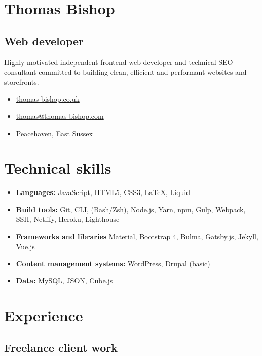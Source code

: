 \documentclass[11pt,a4paper]{article}
\begin{document}
 
\section*{\LARGE{Thomas Bishop}}
\subsection*{\Large{Web developer}}

Highly motivated independent frontend web developer and technical SEO consultant committed to building clean, efficient and performant websites and storefronts.

\begin{itemize}
    \item \href{https://www.thomas-bishop.co.uk}{thomas-bishop.co.uk}
    \item \href{mailto:thomas@thomas-bishop.com}{thomas@thomas-bishop.com}
    \item  \href{https://www.google.com/maps/place/Peacehaven/@50.7980857,-0.0088727,14z/data=!3m1!4b1!4m5!3m4!1s0x47df7d76d09003cd:0x2d61228cfd5cf235!8m2!3d50.793209!4d-0.005174}{Peacehaven, East Sussex}
\end{itemize}

\section*{Technical skills}
\begin{itemize}
    \item \textbf{Languages:} JavaScript, HTML5, CSS3, LaTeX, Liquid
    \item \textbf{Build tools:} Git, CLI, (Bash/Zsh), Node.js, Yarn, npm, Gulp, Webpack, SSH, Netlify, Heroku, Lighthouse
    \item \textbf{Frameworks and libraries}  Material, Bootstrap 4, Bulma, Gatsby.js, Jekyll, Vue.js
    \item \textbf{Content management systems:} WordPress, Drupal (basic) 
    \item \textbf{Data:} MySQL, JSON, Cube.js 
\end{itemize}  

\section*{Experience}
\subsection*{Freelance client work}
\end{document}
